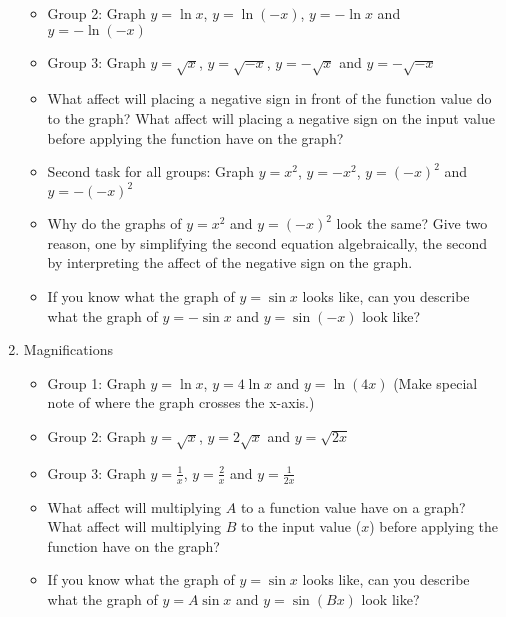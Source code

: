 \documentclass[number]{ximera}
\begin{document}
\begin{enumerate}
\begin{itemize}
\item Group 2: Graph $y = \ln x$, $y = \ln (-x)$, $y = - \ln x$ and $y = - \ln (-x)$

\item Group 3: Graph $y = \sqrt x$, $y = \sqrt {-x}$, $y = - \sqrt x$ and $y = - \sqrt {-x}$

\item What affect will placing a negative sign in front of the function value do to the graph? What affect will placing a negative sign on the input value before applying the function have on the graph?

\item Second task for all groups: Graph $y = x^2$, $y = -x^2$, $y = (-x)^2$ and $y = -(-x)^2$

\item Why do the graphs of $y = x^2$ and $y = (-x)^2$ look the same? Give two reason, one by simplifying the second equation algebraically, the second by interpreting the affect of the negative sign on the graph.

\item If you know what the graph of $y = \sin x$ looks like, can you describe what the graph of $y = - \sin x$ and $y = \sin (-x)$ look like?

\end{itemize}

\newpage

\item Magnifications

\begin{itemize}

\item Group 1: Graph $y = \ln x$, $y = 4 \ln x$ and $y = \ln {(4x)}$ (Make special note of where the graph crosses the x-axis.)

\item Group 2: Graph $y = \sqrt x$, $y = 2 \sqrt x$ and $y = \sqrt {2x}$

\item Group 3: Graph $y = \frac{1}{x}$, $y = \frac{2}{x}$ and $y = \frac{1}{2x}$ 

\item What affect will multiplying $A$ to a function value have on a graph? What affect will multiplying $B$ to the input value ($x$) before applying the function have on the graph?

\item If you know what the graph of $y = \sin x$ looks like, can you describe what the graph of $y = A \sin x$ and $y = \sin (Bx)$ look like?


\end{itemize}
\end{enumerate}
\end{document}
